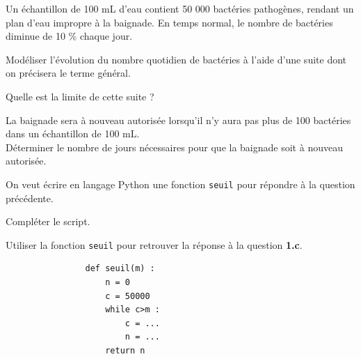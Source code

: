\documentclass[a4paper,11pt,exos]{nsi} %
\begin{document}
Un échantillon de 100 mL d'eau contient 50 000 bactéries pathogènes, rendant un plan d'eau impropre à la baignade. En temps normal, le nombre de bactéries diminue de 10 \% chaque jour.
\begin{enumerate}
    \item \begin{enumalph}
        \item Modéliser l'évolution du nombre quotidien de bactéries à l'aide d'une suite dont on précisera le terme général.
        \item Quelle est la limite de cette suite ?
        \item La baignade sera à nouveau autorisée lorsqu'il n'y aura pas plus de 100 bactéries dans un échantillon de 100 mL.\\
        \faCalculator \hspace*{.3cm} Déterminer le nombre de jours nécessaires pour que la baignade soit à nouveau autorisée.
    \end{enumalph}
    
    \begin{minipage}{11cm}
        \item \faPython \hspace*{.3cm} On veut écrire en langage Python une fonction \texttt{seuil} pour répondre à la question précédente.
        \begin{enumalph}
            \item Compléter le script.
            \item Utiliser la fonction \texttt{seuil} pour retrouver la réponse à la question \textbf{1.c}. 
        \end{enumalph}
    \end{minipage}
    \begin{minipage}{4.5cm}
        \begin{pyc}
            \begin{verbatim}
                def seuil(m) :
                    n = 0
                    c = 50000
                    while c>m :
                        c = ...
                        n = ...
                    return n
            \end{verbatim}
        \end{pyc}
    \end{minipage}
\end{enumerate}
\end{document}
